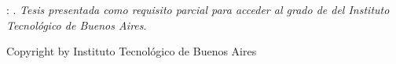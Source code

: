 \vspace*{0.8\textheight}
\noindent \@author: \@title. \textit{Tesis presentada como requisito parcial para acceder al grado de \textbf{\@degree} del Instituto Tecnológico de Buenos Aires}.
\par
\vspace{1\baselineskip}
\noindent Copyright \textcopyright\space\@copyrightYear\space by Instituto Tecnológico de Buenos Aires
